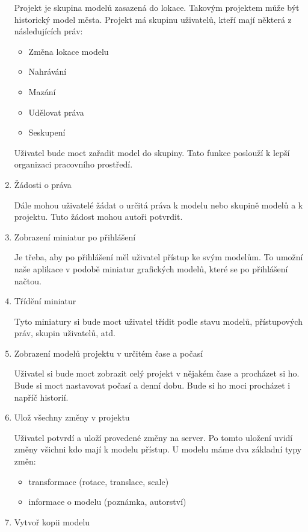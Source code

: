 \documentclass[thesis=B,czech]{FITthesis}[2012/06/26]
\begin{document}
\begin{enumerate}
                Projekt je skupina modelů zasazená do lokace. Takovým projektem může být historický model města. Projekt má skupinu uživatelů, kteří mají některá z následujících práv:
                \begin{itemize}
                    \item Změna lokace modelu
                    \item Nahrávání
                    \item Mazání
                    \item Udělovat práva
                    \item Seskupení
                \end{itemize}
                Uživatel bude moct zařadit model do skupiny. Tato funkce poslouží k lepší organizaci pracovního prostředí.
                \item Žádosti o práva
                
                Dále mohou uživatelé žádat o určitá práva k modelu nebo skupině modelů a k projektu. Tuto žádost mohou autoři potvrdit.
                \item Zobrazení miniatur po přihlášení
                
                Je třeba, aby po přihlášení měl uživatel přístup ke svým modelům. To umožní naše aplikace v podobě miniatur grafických modelů, které se po přihlášení načtou.
                \item Třídění miniatur
                
                Tyto miniatury si bude moct uživatel třídit podle stavu modelů, přístupových práv, skupin uživatelů, atd.
                \item Zobrazení modelů projektu v určitém čase a počasí
                
                Uživatel si bude moct zobrazit celý projekt v nějakém čase a procházet si ho. Bude si moct nastavovat počasí a denní dobu. Bude si ho moci procházet i napříč historií.
                \item Ulož všechny změny v projektu
                
                Uživatel potvrdí a uloží provedené změny na server. Po tomto uložení uvidí změny všichni kdo mají k modelu přístup.
                U modelu máme dva základní typy změn:
                \begin{itemize}
                    \item transformace (rotace, translace, scale)
                    \item informace o modelu (poznámka, autorství)
                \end{itemize}
                \item Vytvoř kopii modelu
                

\end{enumerate}
\end{document}
